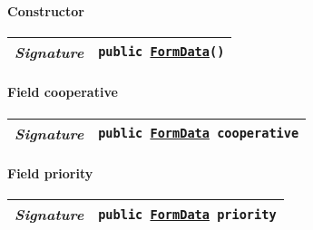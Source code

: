 \begin{adjustwidth}{1.5em}{0pt}
\begin{adjustwidth}{1.5em}{0pt}
\begin{adjustwidth}{1.5em}{0pt}
{\begin{tabularx}{1.0\linewidth}{@{}l R@{}}
      \end{tabularx}}\paragraph{Constructor\label{edu.kit.hci.soli.controller.BookingCreateController.FormData@edu.kit.hci.soli.controller.BookingCreateController.FormData()}}
      \begin{adjustwidth}{1.5em}{0pt}
        {\begin{tabularx}{1.0\linewidth}{@{}l R@{}}
          \emph{Signature} & \texttt{public \texttt{\hyperref[edu.kit.hci.soli.controller.BookingCreateController.FormData]{\texttt{FormData}}}()} \\
          \hline
  
        \end{tabularx}}
      \end{adjustwidth}\paragraph{Field cooperative\label{edu.kit.hci.soli.controller.BookingCreateController.FormData@cooperative}}
      \begin{adjustwidth}{1.5em}{0pt}
        {\begin{tabularx}{1.0\linewidth}{@{}l R@{}}
          \emph{Signature} & \texttt{public \texttt{\hyperref[edu.kit.hci.soli.controller.BookingCreateController.FormData]{\texttt{FormData}}} cooperative} \\
          \hline
  
        \end{tabularx}}
      \end{adjustwidth}\paragraph{Field priority\label{edu.kit.hci.soli.controller.BookingCreateController.FormData@priority}}
      \begin{adjustwidth}{1.5em}{0pt}
        {\begin{tabularx}{1.0\linewidth}{@{}l R@{}}
          \emph{Signature} & \texttt{public \texttt{\hyperref[edu.kit.hci.soli.controller.BookingCreateController.FormData]{\texttt{FormData}}} priority} \\
          \hline
  

\end{tabularx}}
\end{adjustwidth}
\end{adjustwidth}
\end{adjustwidth}
\end{adjustwidth}
